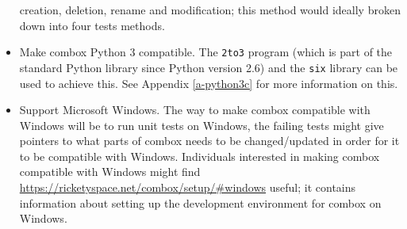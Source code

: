 \begin{itemize}
  creation, deletion, rename and modification; this method would
  ideally broken down into four tests methods.
\item Make combox Python 3 compatible. The \verb+2to3+ program (which
  is part of the standard Python library since Python version 2.6) and
  the \verb+six+ library can be used to achieve this. See Appendix
  \ref{a-python3c} for more information on this.
\item Support Microsoft Windows. The way to make combox compatible
  with Windows will be to run unit tests on Windows, the failing tests
  might give pointers to what parts of combox needs to be
  changed/updated in order for it to be compatible with
  Windows. Individuals interested in making combox compatible with
  Windows might find
  \url{https://ricketyspace.net/combox/setup/#windows} useful; it
  contains information about setting up the development environment
  for combox on Windows.
\end{itemize}

